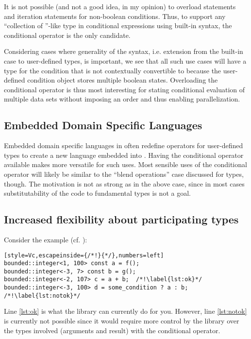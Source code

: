 It is not possible (and not a good idea, in my opinion) to overload  statements and iteration statements for non-boolean conditions.
Thus, to support any “collection of \bool{}”-like type in conditional expressions using built-in syntax, the conditional operator is the only candidate.

Considering cases where generality of the syntax, i.e. extension from the built-in case to user-defined types, is important, we see that all such use cases will have a type for the condition that is not contextually convertible to \bool because the user-defined condition object stores multiple boolean states.
Overloading the conditional operator is thus most interesting for stating conditional evaluation of multiple data sets without imposing an order and thus enabling parallelization.

\subsection{Embedded Domain Specific Languages}
Embedded domain specific languages in \CC{} often redefine operators for user-defined types to create a new language embedded into \CC{}.
Having the conditional operator available makes \CC{} more versatile for such uses.
Most sensible uses of the conditional operator will likely be similar to the “blend operations” case discussed for  types, though.
The motivation is not as strong as in the above case, since in most cases substitutability of the code to fundamental types is not a goal.

\subsection{Increased flexibility about participating types}
Consider the  example (cf. \cite{site.bounded-integer}):
\smallskip\begin{lstlisting}[style=Vc,escapeinside={/*!}{*/},numbers=left]
bounded::integer<1, 100> const a = f();
bounded::integer<-3, 7> const b = g();
bounded::integer<-2, 107> c = a + b;  /*!\label{lst:ok}*/
bounded::integer<-3, 100> d = some_condition ? a : b;  /*!\label{lst:notok}*/
\end{lstlisting}

Line \ref{lst:ok} is what the  library can currently do for you.
However, line \ref{lst:notok} is currently not possible since it would require more control by the library over the types involved (arguments and result) with the conditional operator.

